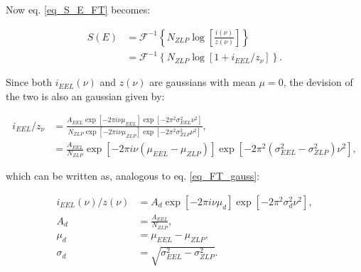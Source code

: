 Now eq. \eqref{eq_S_E_FT} becomes:

\begin{equation}\label{eq_S_gauss}
\begin{aligned}
S(E) &= \mathcal{F}^{-1}\left\{N_{ZLP}\operatorname{log}\left[\frac{i(\nu)}{z(\nu)}\right]\right\} \\
&= \mathcal{F}^{-1}\left\{N_{ZLP}\operatorname{log}\left[1+ i_{EEL}/z_{\nu}\right]\right\}.
\end{aligned}
\end{equation}

Since both $i_{EEL}(\nu)$ and $z(\nu)$ are gaussians with mean $\mu = 0$, the devision of the two is also an gaussian given by:

\begin{equation}
\begin{aligned}
i_{EEL}/z_{\nu} &= \frac{A_{EEL} \exp{\left[-2 \pi i \nu \mu_{EEL}\right]} \exp{\left[-2 \pi^{2} \sigma_{EEL}^{2} \nu^{2}\right]}}{N_{ZLP} \exp{\left[-2 \pi i \nu \mu_{ZLP}\right]} \exp{\left[-2 \pi^{2} \sigma_{ZLP}^{2} \nu^{2}\right]}} ,\\
&= \frac{A_{EEL}}{N_{ZLP}} \exp{\left[-2 \pi i \nu (\mu_{EEL} - \mu_{ZLP})\right]} \exp{\left[-2 \pi^{2} (\sigma_{EEL}^{2} - \sigma_{ZLP}^{2}) \nu^{2}\right]},
\end{aligned}
\end{equation}

which can be written as, analogous to eq. \eqref{eq_FT_gauss}:



\begin{equation}\label{eq_gauss_conv2}
\begin{aligned}
i_{EEL}(\nu)/z(\nu) &= A_d \exp{[-2\pi i \nu \mu_d]} \exp{\left[ -2\pi^2 \sigma_d^2 \nu^2 \right]},\\
A_d &= \frac{A_{EEL}}{N_{ZLP}},\\
\mu_d &= \mu_{EEL} - \mu_{ZLP},\\
\sigma_d &= \sqrt{\sigma_{EEL}^2 - \sigma_{ZLP}^2}.
\end{aligned}
\end{equation}






